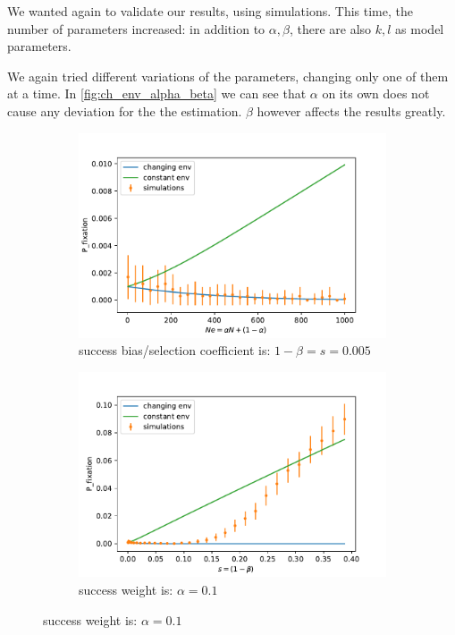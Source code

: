 \documentclass[12pt]{extarticle}
\begin{document}
We wanted again to validate our results, using simulations.
This time, the number of parameters increased: in addition to $\alpha,\beta$, there are also $k,l$ as model parameters.

We again tried different variations of the parameters, changing only one of them at a time.
In \cref{fig:ch_env_alpha_beta} we can see that $\alpha$ on its own does not cause any deviation for the the estimation. $\beta$ however affects the results greatly.

\begin{figure}[t]
  \begin{center}
  \begin{subfigure}[a]{0.49\linewidth}
  \caption{success bias/selection coefficient is: $1-\beta=s=0.005$}
    \includegraphics[width=\linewidth]{../figures/changed_env/ch_env_var_alpha.pdf}
   \end{subfigure}
   \begin{subfigure}[a]{0.49\linewidth}
   \caption{success weight is: $\alpha=0.1$}
    \includegraphics[width=\linewidth]{../figures/changed_env/ch_env_var_beta.pdf}

\end{subfigure}
\end{center}
\end{figure}
\end{document}

